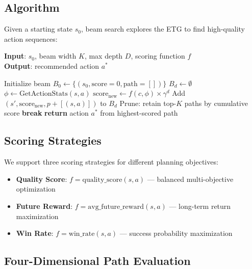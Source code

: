 \documentclass[letterpaper]{article}
\begin{document}
\subsection{Algorithm}

Given a starting state $s_0$, beam search explores the ETG to find high-quality action sequences:

\begin{algorithm}[t]
\caption{Beam Search on ETG}
\label{alg:beam}
\textbf{Input}: $s_0$, beam width $K$, max depth $D$, scoring function $f$ \\
\textbf{Output}: recommended action $a^*$
\begin{algorithmic}[1]
\STATE Initialize beam $B_0 \leftarrow \{(s_0, \text{score}=0, \text{path}=[])\}$
    \STATE $B_d \leftarrow \emptyset$
            \STATE $\phi \leftarrow \text{GetActionStats}(s, a)$
            \STATE $\text{score}_{\text{new}} \leftarrow f(c, \phi) \times \gamma^d$
                \STATE Add $(s', \text{score}_{\text{new}}, p + [(s, a)])$ to $B_d$
            \ENDFOR
        \ENDFOR
    \ENDFOR
    \STATE Prune: retain top-$K$ paths by cumulative score
        \STATE \textbf{break}
    \ENDIF
\ENDFOR
\STATE \textbf{return} action $a^*$ from highest-scored path
\end{algorithmic}
\end{algorithm}

\subsection{Scoring Strategies}

We support three scoring strategies for different planning objectives:

\begin{itemize}
    \item \textbf{Quality Score}: $f = \text{quality\_score}(s,a)$ — balanced multi-objective optimization
    \item \textbf{Future Reward}: $f = \text{avg\_future\_reward}(s,a)$ — long-term return maximization
    \item \textbf{Win Rate}: $f = \text{win\_rate}(s,a)$ — success probability maximization
\end{itemize}

\subsection{Four-Dimensional Path Evaluation}
\end{document}
